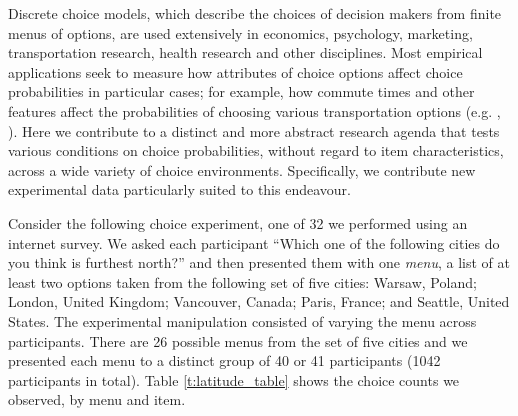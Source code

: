 \documentclass[11pt,letter]{article}
\newcommand{\menu}{menu}
\begin{document}
Discrete choice models, which describe the choices of decision makers from finite menus of options, are used extensively in economics, psychology, marketing, transportation research, health research and other disciplines.
Most empirical applications seek to measure how attributes of choice options affect choice probabilities in particular cases; for example, how commute times and other features affect the probabilities of choosing various transportation options (e.g. \citeauthor{Trai78}, \citeyear{Trai78}).
Here we contribute to a distinct and more abstract research agenda that tests various conditions on choice probabilities, without regard to item characteristics, across a wide variety of choice environments.
Specifically, we contribute new experimental data particularly suited to this endeavour.

Consider the following choice experiment, one of 32 we performed using an internet survey.
We asked each participant ``Which one of the following cities do you think is furthest north?'' and then presented them with one {\em menu}, a list of at least two options taken from the following set of five cities: Warsaw, Poland; London, United Kingdom; Vancouver, Canada; Paris, France; and Seattle, United States.
The experimental manipulation consisted of varying the menu across participants.
There are 26 possible menus from the set of five cities and we presented each \menu{} to a distinct group of 40 or 41 participants (1042 participants in total).
Table \ref{t:latitude_table} shows the choice counts we observed, by menu and item.

\begin{table}
  
  \caption{Observed choice counts and proportions for the ``Latitude'' domain, where the prompt is ``Which one of the following cities do you think is furthest north?'' and the universe of items is $\{a,b,c,d,e\}$, where $a$ is Warsaw, Poland; $b$ is London, United Kingdom, $c$ is Vancouver, Canada; $d$ is Paris, France; and $e$ is Seattle, United States.
  Each row gives counts and proportions for the \menu{} shown in the first column.
  The second through sixth columns show the number of participants who chose the items $a$, $b$, $c$, $d$ and $e$, respectively, from the \menu{}.
  $n_A(x)$ is the number of participants who chose item $x$ from \menu{} $A$, $x = a, b, c, d, e$.
  Where an item is not in the \menu{}, a dash is displayed.
  Thus, a zero unambiguously means that an item was available but never chosen from the \menu{} in question.
  The final five columns show the corresponding choice proportions.
  $\hat{P}_A(x)$ is the proportion of participants who chose item $x$ from \menu{} $A$.
  Analogous tables for all 32 domains are provided in the supplementary materials.}
  \label{t:latitude_table}
\end{table}
\end{document}
